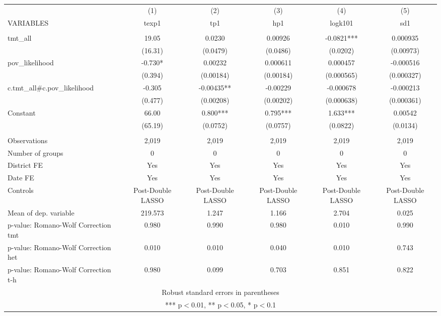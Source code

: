 \documentclass[]{article}
\begin{document}
\begin{tabular}{lccccc} \hline
 & (1) & (2) & (3) & (4) & (5) \\
VARIABLES & texp1 & tp1 & hp1 & logk101 & sd1 \\ \hline
 &  &  &  &  &  \\
tmt\_all & 19.05 & 0.0230 & 0.00926 & -0.0821*** & 0.000935 \\
 & (16.31) & (0.0479) & (0.0486) & (0.0202) & (0.00973) \\
pov\_likelihood & -0.730* & 0.00232 & 0.000611 & 0.000457 & -0.000516 \\
 & (0.394) & (0.00184) & (0.00184) & (0.000565) & (0.000327) \\
c.tmt\_all\#c.pov\_likelihood & -0.305 & -0.00435** & -0.00229 & -0.000678 & -0.000213 \\
 & (0.477) & (0.00208) & (0.00202) & (0.000638) & (0.000361) \\
Constant & 66.00 & 0.800*** & 0.795*** & 1.633*** & 0.00542 \\
 & (65.19) & (0.0752) & (0.0757) & (0.0822) & (0.0134) \\
 &  &  &  &  &  \\
Observations & 2,019 & 2,019 & 2,019 & 2,019 & 2,019 \\
Number of groups & 0 & 0 & 0 & 0 & 0 \\
District FE & Yes & Yes & Yes & Yes & Yes \\
Date FE & Yes & Yes & Yes & Yes & Yes \\
Controls & Post-Double LASSO & Post-Double LASSO & Post-Double LASSO & Post-Double LASSO & Post-Double LASSO \\
Mean of dep. variable & 219.573 & 1.247 & 1.166 & 2.704 & 0.025 \\
p-value: Romano-Wolf Correction tmt & 0.980 & 0.990 & 0.980 & 0.010 & 0.990 \\
p-value: Romano-Wolf Correction het & 0.010 & 0.010 & 0.040 & 0.010 & 0.743 \\
 p-value: Romano-Wolf Correction t-h & 0.980 & 0.099 & 0.703 & 0.851 & 0.822 \\ \hline
\multicolumn{6}{c}{ Robust standard errors in parentheses} \\
\multicolumn{6}{c}{ *** p$<$0.01, ** p$<$0.05, * p$<$0.1} \\
\end{tabular}
\end{document}
